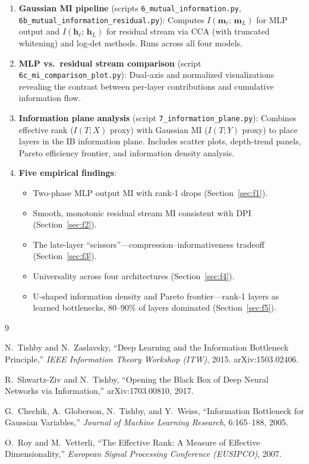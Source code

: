 \documentclass[11pt]{article}
\begin{document}
\begin{enumerate}
    \item \textbf{Gaussian MI pipeline} (scripts \texttt{6\_mutual\_information.py}, \texttt{6b\_mutual\_information\_residual.py}): Computes $I(\mathbf{m}_\ell;\, \mathbf{m}_L)$ for MLP output and $I(\mathbf{h}_\ell;\, \mathbf{h}_L)$ for residual stream via CCA (with truncated whitening) and log-det methods. Runs across all four models.

    \item \textbf{MLP vs.\ residual stream comparison} (script \texttt{6c\_mi\_comparison\_plot.py}): Dual-axis and normalized visualizations revealing the contrast between per-layer contributions and cumulative information flow.

    \item \textbf{Information plane analysis} (script \texttt{7\_information\_plane.py}): Combines effective rank ($I(T;X)$ proxy) with Gaussian MI ($I(T;Y)$ proxy) to place layers in the IB information plane. Includes scatter plots, depth-trend panels, Pareto efficiency frontier, and information density analysis.

    \item \textbf{Five empirical findings}:
    \begin{itemize}
        \item Two-phase MLP output MI with rank-1 drops (Section~\ref{sec:f1}).
        \item Smooth, monotonic residual stream MI consistent with DPI (Section~\ref{sec:f2}).
        \item The late-layer ``scissors''---compression--informativeness tradeoff (Section~\ref{sec:f3}).
        \item Universality across four architectures (Section~\ref{sec:f4}).
        \item U-shaped information density and Pareto frontier---rank-1 layers as learned bottlenecks, 80--90\% of layers dominated (Section~\ref{sec:f5}).
    \end{itemize}
\end{enumerate}


\begin{thebibliography}{9}

N.~Tishby and N.~Zaslavsky,
``Deep Learning and the Information Bottleneck Principle,''
\emph{IEEE Information Theory Workshop (ITW)}, 2015.
arXiv:1503.02406.

R.~Shwartz-Ziv and N.~Tishby,
``Opening the Black Box of Deep Neural Networks via Information,''
arXiv:1703.00810, 2017.

G.~Chechik, A.~Globerson, N.~Tishby, and Y.~Weiss,
``Information Bottleneck for Gaussian Variables,''
\emph{Journal of Machine Learning Research}, 6:165--188, 2005.

O.~Roy and M.~Vetterli,
``The Effective Rank: A Measure of Effective Dimensionality,''
\emph{European Signal Processing Conference (EUSIPCO)}, 2007.

\end{thebibliography}
\end{document}
